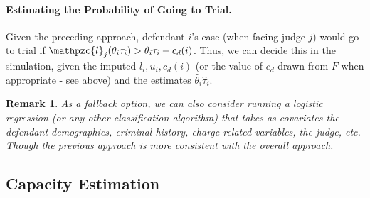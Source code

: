 \documentclass[11pt, oneside]{article}   	%
\theoremstyle{ModifiedStyle}
\newtheorem{remark}{Remark}
\begin{document}
\paragraph{Estimating the Probability of Going to Trial.} Given the preceding approach, defendant $i$'s case (when facing judge $j$) would go to trial if $\mathpzc{l}_j(\theta_i\tau_i) > \theta_i\tau_i + c_d(i)$. Thus, we can decide this in the simulation, given the imputed $l_i,u_i,c_d(i)$ (or the value of $c_d$ drawn from $F$ when appropriate - see above) and the estimates $\hat{\theta}_i\hat{\tau}_i$.
%
\begin{remark}
	As a fallback option, we can also consider running a logistic regression (or any other classification algorithm) that takes as covariates the defendant demographics, criminal history, charge related variables, the judge, etc. Though the previous approach is more consistent with the overall approach.
\end{remark}

\subsection{Capacity Estimation}
\label{Sec:Capacity_Estimation}
\end{document}
